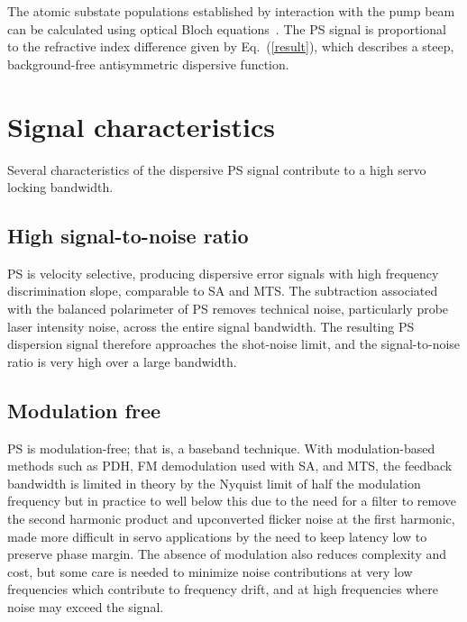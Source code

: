 \documentclass[10pt,letterpaper]{article}
\begin{document}
The atomic substate populations established by interaction with the pump beam can be calculated using optical Bloch equations~\cite{hughes_polarization_2009}.
The PS signal is proportional to the refractive index difference given by Eq.~(\ref{result}), which describes a steep, background-free antisymmetric dispersive function.

\section{Signal characteristics}
Several characteristics of the dispersive PS signal contribute to a high servo locking bandwidth.

\subsection{High signal-to-noise ratio}
PS is velocity selective, producing dispersive error signals with high frequency discrimination slope, comparable to SA and MTS.
The subtraction associated with the balanced polarimeter of PS removes technical noise, particularly probe laser intensity noise, across the entire signal bandwidth.
The resulting PS dispersion signal therefore approaches the shot-noise limit, and the signal-to-noise ratio is very high over a large bandwidth.

\subsection{Modulation free}
PS is modulation-free; that is, a baseband technique.
With modulation-based methods such as PDH, FM demodulation used with SA, and MTS, the feedback bandwidth is limited in theory by the Nyquist limit of half the modulation frequency but in practice to well below this due to the need for a filter to remove the second harmonic product and upconverted flicker noise at the first harmonic, made more difficult in servo applications by the need to keep latency low to preserve phase margin.
The absence of modulation also reduces complexity and cost, but some care is needed to minimize noise contributions at very low frequencies which contribute to frequency drift, and at high frequencies where noise may exceed the signal.
\end{document}
